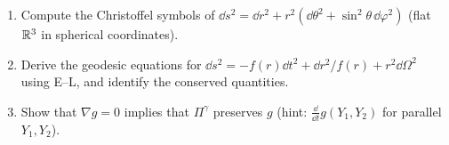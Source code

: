 \begin{exercises}
\begin{enumerate}[nosep]
\item Compute the Christoffel symbols of $\dd s^2=\dd r^2+r^2(\dd\theta^2+\sin^2\theta\,\dd\varphi^2)$ (flat $\mathbb{R}^3$ in spherical coordinates).
\item Derive the geodesic equations for $\dd s^2=-f(r)\dd t^2+\dd r^2/f(r)+r^2\dd\Omega^2$ using E--L, and identify the conserved quantities.
\item Show that $\nabla g=0$ implies that $\Pi^\gamma$ preserves $g$ (hint: $\frac{\dd}{\dd t}g(Y_1,Y_2)$ for parallel $Y_1,Y_2$).
\end{enumerate}
\end{exercises}
